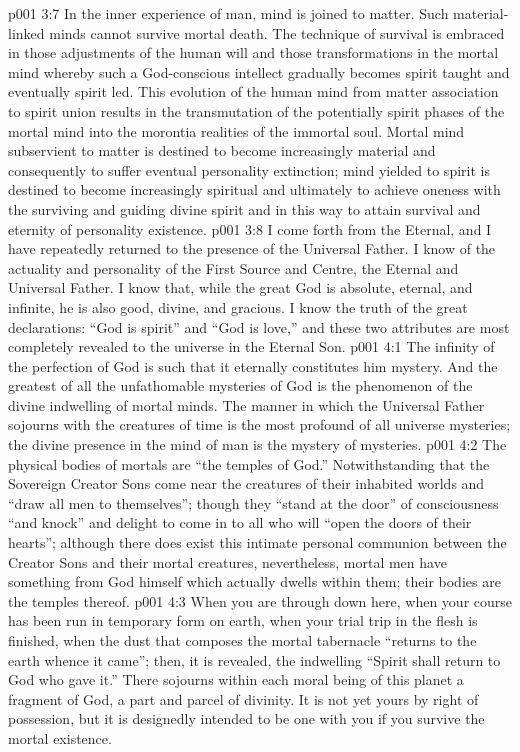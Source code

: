 \vs p001 3:7 \pc In the inner experience of man, mind is joined to matter. Such material\hyp{}linked minds cannot survive mortal death. The technique of survival is embraced in those adjustments of the human will and those transformations in the mortal mind whereby such a God\hyp{}conscious intellect gradually becomes spirit taught and eventually spirit led. This evolution of the human mind from matter association to spirit union results in the transmutation of the potentially spirit phases of the mortal mind into the morontia realities of the immortal soul. Mortal mind subservient to matter is destined to become increasingly material and consequently to suffer eventual personality extinction; mind yielded to spirit is destined to become increasingly spiritual and ultimately to achieve oneness with the surviving and guiding divine spirit and in this way to attain survival and eternity of personality existence.
\vs p001 3:8 I come forth from the Eternal, and I have repeatedly returned to the presence of the Universal Father. I know of the actuality and personality of the First Source and Centre, the Eternal and Universal Father. I know that, while the great God is absolute, eternal, and infinite, he is also good, divine, and gracious. I know the truth of the great declarations: “God is spirit” and “God is love,” and these two attributes are most completely revealed to the universe in the Eternal Son.
\vs p001 4:1 The infinity of the perfection of God is such that it eternally constitutes him mystery. And the greatest of all the unfathomable mysteries of God is the phenomenon of the divine indwelling of mortal minds. The manner in which the Universal Father sojourns with the creatures of time is the most profound of all universe mysteries; the divine presence in the mind of man is the mystery of mysteries.
\vs p001 4:2 The physical bodies of mortals are “the temples of God.” Notwithstanding that the Sovereign Creator Sons come near the creatures of their inhabited worlds and “draw all men to themselves”; though they “stand at the door” of consciousness “and knock” and delight to come in to all who will “open the doors of their hearts”; although there does exist this intimate personal communion between the Creator Sons and their mortal creatures, nevertheless, mortal men have something from God himself which actually dwells within them; their bodies are the temples thereof.
\vs p001 4:3 When you are through down here, when your course has been run in temporary form on earth, when your trial trip in the flesh is finished, when the dust that composes the mortal tabernacle “returns to the earth whence it came”; then, it is revealed, the indwelling “Spirit shall return to God who gave it.” There sojourns within each moral being of this planet a fragment of God, a part and parcel of divinity. It is not yet yours by right of possession, but it is designedly intended to be one with you if you survive the mortal existence.
